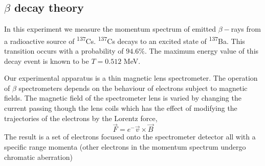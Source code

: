 \documentclass[12pt, a4paper]{article}
\begin{document}
\begin{multicols}{2}

\section{$\beta$ decay theory}

In this experiment we measure the momentum spectrum of emitted $\beta-$rays from a radioactive source of  \textsuperscript{137}Cs.
 \textsuperscript{137}Cs decays to an excited state of \textsuperscript{137}Ba. This transition occurs with a probability of $94.6\%$\cite{SPA}. The maximum energy value of this decay event is known to be $T = 0.512$ MeV.

Our experimental apparatus is a thin magnetic lens spectrometer. The operation of $\beta$ spectrometers depends on the behaviour of electrons subject to magnetic fields. The magnetic field of the spectrometer lens is varied by changing the current passing though the lens coils which has the effect of modifying the trajectories of the electrons by the Lorentz force,
\begin{equation}\vec{F} = e^{-} \vec{v} \times \vec{B}
\end{equation} 
 The result is a set of electrons focused onto the spectrometer detector all with a specific range momenta (other electrons in the momentum spectrum undergo chromatic aberration)








\end{multicols}


\end{document}

